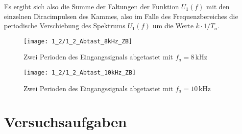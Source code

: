 \documentclass[a4paper, 12pt]{article}
\begin{document}
Es ergibt sich also die Summe der Faltungen der Funktion $U_1(f)$ mit den einzelnen
Diracimpulsen des Kammes, also im Falle des Frequenzbereiches die periodische Verschiebung
des Spektrums $U_1(f)$ um die Werte $k \cdot 1/T_a$.




\begin{figure}[H]
	\texttt{[image: 1\_2/1\_2\_Abtast\_8kHz\_ZB]}
  \caption{Zwei Perioden des Eingangssignals abgetastet mit $f_a=8\,\si{\kilo\hertz}$}
\end{figure}

\begin{figure}[H]
	\texttt{[image: 1\_2/1\_2\_Abtast\_10kHz\_ZB]}
  \caption{Zwei Perioden des Eingangssignals abgetastet mit $f_a=10\,\si{\kilo\hertz}$}
\end{figure}





\section{Versuchsaufgaben}
\end{document}
